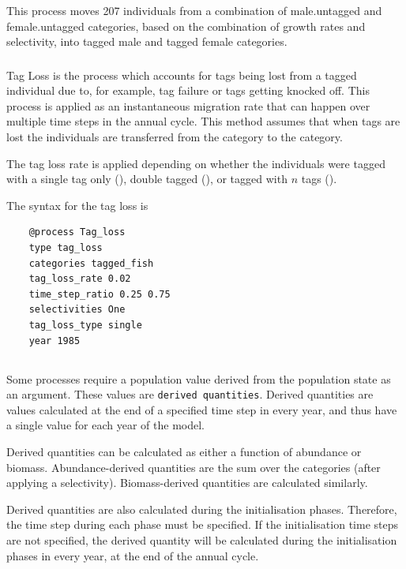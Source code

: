 This process moves 207 individuals from a combination of male.untagged and female.untagged categories, based on the combination of growth rates and selectivity, into tagged male and tagged female categories.

\subsubsection{}

Tag Loss is the process which accounts for tags being lost from a tagged individual due to, for example, tag failure or tags getting knocked off. This process is applied as an instantaneous migration rate that can happen over multiple time steps in the annual cycle. This method assumes that when tags are lost the individuals are transferred from the  category to the  category.

The tag loss rate is applied depending on whether the individuals were tagged with a single tag only (), double tagged (), or tagged with $n$ tags ().

The syntax for the tag loss is

{\small{\begin{verbatim}
	@process Tag_loss
	type tag_loss
	categories tagged_fish
	tag_loss_rate 0.02
	time_step_ratio 0.25 0.75
	selectivities One
	tag_loss_type single
	year 1985
		\end{verbatim}}}

\subsection{\label{sec:derived-quantities}}

Some processes require a population value derived from the population state as an argument. These values are \texttt{derived quantities}. Derived quantities are values calculated at the end of a specified time step in every year, and thus have a single value for each year of the model.

Derived quantities can be calculated as either a function of abundance or biomass. Abundance-derived quantities are the sum over the categories (after applying a selectivity). Biomass-derived quantities are calculated similarly.

Derived quantities are also calculated during the initialisation phases. Therefore, the time step during each phase must be specified. If the initialisation time steps are not specified, the derived quantity will be calculated during the initialisation phases in every year, at the end of the annual cycle.

